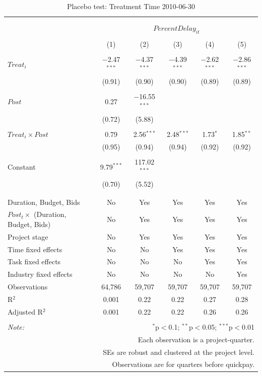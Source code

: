 \documentclass[
]{article}
\begin{document}
\begin{table}[H] \centering 
  \caption{Placebo test: Treatment Time 2010-06-30} 
  \label{} 
\small 
\begin{tabular}{@{\extracolsep{-2pt}}lccccc} 
\\[-1.8ex]\hline 
\hline \\[-1.8ex] 
\\[-1.8ex] & \multicolumn{5}{c}{$PercentDelay_{it}$} \\ 
\\[-1.8ex] & (1) & (2) & (3) & (4) & (5)\\ 
\hline \\[-1.8ex] 
 $Treat_i$ & $-$2.47$^{***}$ & $-$4.37$^{***}$ & $-$4.39$^{***}$ & $-$2.62$^{***}$ & $-$2.86$^{***}$ \\ 
  & (0.91) & (0.90) & (0.90) & (0.89) & (0.89) \\ 
  & & & & & \\ 
 $Post$ & 0.27 & $-$16.55$^{***}$ &  &  &  \\ 
  & (0.72) & (5.88) &  &  &  \\ 
  & & & & & \\ 
 $Treat_i \times Post$ & 0.79 & 2.56$^{***}$ & 2.48$^{***}$ & 1.73$^{*}$ & 1.85$^{**}$ \\ 
  & (0.95) & (0.94) & (0.94) & (0.92) & (0.92) \\ 
  & & & & & \\ 
 Constant & 9.79$^{***}$ & 117.02$^{***}$ &  &  &  \\ 
  & (0.70) & (5.52) &  &  &  \\ 
  & & & & & \\ 
\hline \\[-1.8ex] 
Duration, Budget, Bids & No & Yes & Yes & Yes & Yes \\ 
$Post_t \times$  (Duration, Budget, Bids) & No & Yes & Yes & Yes & Yes \\ 
Project stage & No & Yes & Yes & Yes & Yes \\ 
Time fixed effects & No & No & Yes & Yes & Yes \\ 
Task fixed effects & No & No & No & Yes & Yes \\ 
Industry fixed effects & No & No & No & No & Yes \\ 
Observations & 64,786 & 59,707 & 59,707 & 59,707 & 59,707 \\ 
R$^{2}$ & 0.001 & 0.22 & 0.22 & 0.27 & 0.28 \\ 
Adjusted R$^{2}$ & 0.001 & 0.22 & 0.22 & 0.26 & 0.26 \\ 
\hline 
\hline \\[-1.8ex] 
\textit{Note:}  & \multicolumn{5}{r}{$^{*}$p$<$0.1; $^{**}$p$<$0.05; $^{***}$p$<$0.01} \\ 
 & \multicolumn{5}{r}{Each observation is a project-quarter.} \\ 
 & \multicolumn{5}{r}{SEs are robust and clustered at the project level.} \\ 
 & \multicolumn{5}{r}{Observations are for quarters before quickpay.} \\ 
\end{tabular} 
\end{table}
\end{document}
